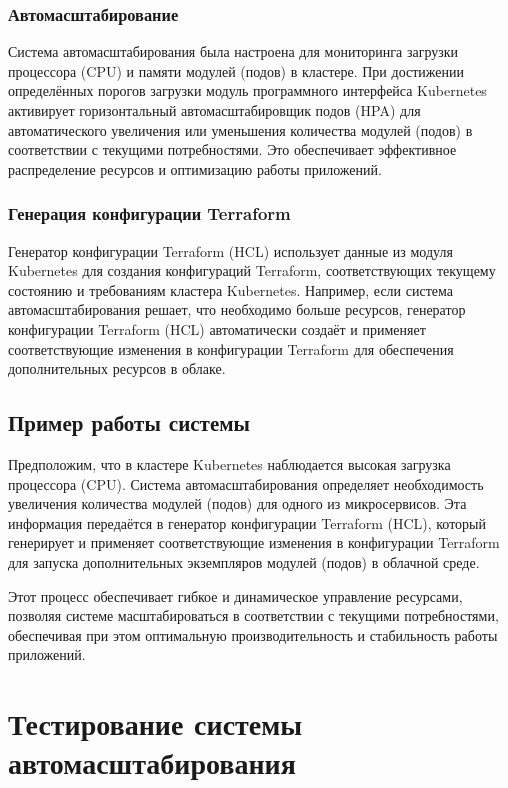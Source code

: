   \subsubsection{Автомасштабирование}
  
  Система автомасштабирования была настроена для мониторинга загрузки процессора
(CPU) и памяти модулей (подов) в кластере. При достижении определённых порогов
загрузки модуль программного интерфейса Kubernetes активирует горизонтальный
автомасштабировщик подов (HPA) для автоматического увеличения или уменьшения
количества модулей (подов) в соответствии с текущими потребностями. Это
обеспечивает эффективное распределение ресурсов и оптимизацию работы приложений.
  
  \subsubsection{Генерация конфигурации Terraform}
  
  Генератор конфигурации Terraform (HCL) использует данные из модуля Kubernetes
для создания конфигураций Terraform, соответствующих текущему состоянию и
требованиям кластера Kubernetes. Например, если система автомасштабирования
решает, что необходимо больше ресурсов, генератор конфигурации Terraform (HCL)
автоматически создаёт и применяет соответствующие изменения в конфигурации
Terraform для обеспечения дополнительных ресурсов в облаке.
  
  \subsection{Пример работы системы}
  
  Предположим, что в кластере Kubernetes наблюдается высокая загрузка процессора
(CPU). Система автомасштабирования определяет необходимость увеличения
количества модулей (подов) для одного из микросервисов. Эта информация
передаётся в генератор конфигурации Terraform (HCL), который генерирует и
применяет соответствующие изменения в конфигурации Terraform для запуска
дополнительных экземпляров модулей (подов) в облачной среде.
  
  Этот процесс обеспечивает гибкое и динамическое управление ресурсами, позволяя
системе масштабироваться в соответствии с текущими потребностями, обеспечивая
при этом оптимальную производительность и стабильность работы приложений.
  
  \section{Тестирование системы автомасштабирования}
  
